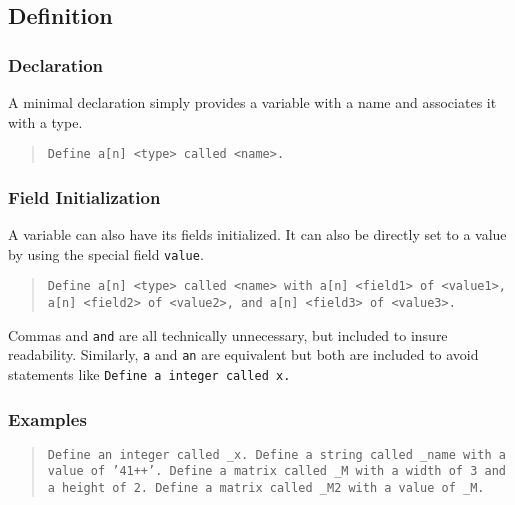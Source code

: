 \documentclass{article}
\newcommand{\code}[1]{\texttt{#1}}
\newcommand{\codeblock}[1]{\begin{quote}\code{#1}\end{quote}}
\begin{document}
\subsection{Definition}
\subsubsection{Declaration}
A minimal declaration simply provides a variable with a name and associates it with a type.

\codeblock{Define a[n] <type> called <name>.}

\subsubsection{Field Initialization}
A variable can also have its fields initialized. It can also be directly set to a value by using the special field \code{value}.

\codeblock{Define a[n] <type> called <name> with a[n] <field1> of <value1>, a[n] <field2> of <value2>, and a[n] <field3> of <value3>.}

\noindent Commas and \code{and} are all technically unnecessary, but included to insure readability. Similarly, \code{a} and \code{an} are equivalent but both are included to avoid statements like \code{Define a integer called x.}
\subsubsection{Examples}

\codeblock{Define an integer called \_{}x. Define a string called \_{}name with a value of '41++'. Define a matrix called \_{}M with a width of 3 and a height of 2. Define a matrix called \_{}M2 with a value of \_{}M.}
\end{document}
